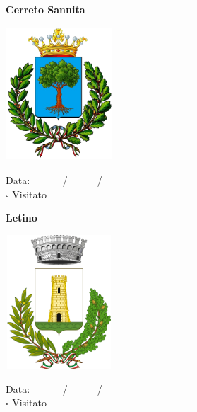 \documentclass[a5paper,12pt]{article}
\begin{document}
\noindent
\begin{minipage}[t]{0.45\textwidth}
    \begin{center}
        \textbf{Cerreto Sannita}
    \end{center}
    \vspace{-0.5cm} %
    \begin{center}
        \includegraphics[height= 5cm, width=4cm]{Campania/Cerreto_Sannita-Stemma.png}
    \end{center}
    \vspace{-0.4cm} %
    \begin{flushleft}
        Data: \_\_\_\_/\_\_\_\_/\_\_\_\_\_\_\_\_\_\_\_\_ \\
        $\square$ Visitato
    \end{flushleft}
\end{minipage}
\hfill
\noindent
\begin{minipage}[t]{0.45\textwidth}
    \begin{center}
        \textbf{Letino}
    \end{center}
    \vspace{-0.5cm} %
    \begin{center}
        \includegraphics[height= 5cm, width=4cm]{Campania/Letino-Stemma.png}
    \end{center}
    \vspace{-0.4cm} %
    \begin{flushleft}
        Data: \_\_\_\_/\_\_\_\_/\_\_\_\_\_\_\_\_\_\_\_\_ \\
        $\square$ Visitato
    \end{flushleft}
\end{minipage}
\end{document}
